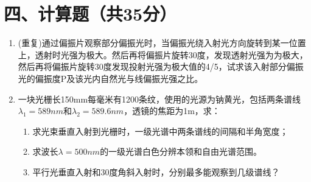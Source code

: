 \documentclass[12pt, a4paper]{article}
\theoremstyle{solution}
\begin{document}
\section*{四、计算题（共35分）}
\begin{enumerate}
    \item (重复)通过偏振片观察部分偏振光时，当偏振光绕入射光方向旋转到某一位置上，透射时光强为极大。然后再将偏振片旋转30度，发现透射光强为为极大，然后再将偏振片旋转30度发现投射光强为极大值的4/5，试求该入射部分偏振光的偏振度P及该光内自然光与线偏振光强之比。
    \item 一块光栅长150mm每毫米有1200条纹，使用的光源为钠黄光，包括两条谱线\(\lambda_1=589nm\)和\(\lambda_2=589.6nm\)，透镜的焦距为1m，求：
    \begin{enumerate}
        \item 求光束垂直入射到光栅时，一级光谱中两条谱线的间隔和半角宽度；
        \item 求波长\(\lambda=500nm\)的一级光谱白色分辨本领和自由光谱范围。
        \item 平行光垂直入射和30度角斜入射时，分别最多能观察到几级谱线？
    \end{enumerate}






\end{enumerate}
\end{document}
